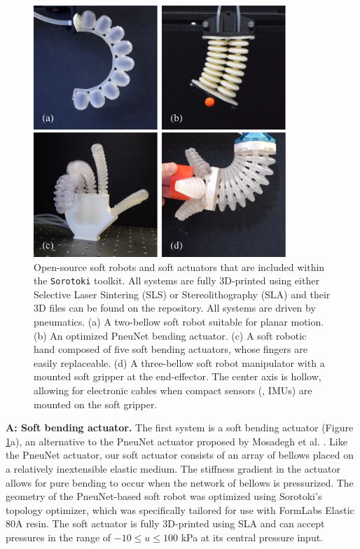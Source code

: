 \begin{figure}[!t]
    \centering
    \includegraphics*[width=0.85\textwidth]{./pdf/thesis-figure-6-1.pdf}
    \caption{\small Open-source soft robots and soft actuators that are included within the \texttt{Sorotoki} toolkit. All systems are fully 3D-printed using either Selective Laser Sintering (SLS) or Stereolithography (SLA) and their 3D files can be found on the repository. All systems are driven by pneumatics. (a) A two-bellow soft robot suitable for planar motion. (b) An optimized PneuNet bending actuator. (c) A soft robotic hand composed of five soft bending actuators, whose fingers are easily replaceable. (d) A three-bellow soft robot manipulator with a mounted soft gripper at the end-effector. The center axis is hollow, allowing for electronic cables when compact sensors (\eg, IMUs) are mounted on the soft gripper.}
    \vspace{-3mm}
    \label{fig:C5:examplebots}
\end{figure}
%  
\textbf{A: Soft bending actuator.} The first system is a soft bending actuator (Figure \ref{fig:C5:examplebots}a), an alternative to the PneuNet actuator proposed by Mosadegh et al. \cite{Mosadegh2014}. Like the PneuNet actuator, our soft actuator consists of an array of bellows placed on a relatively inextensible elastic medium. The stiffness gradient in the actuator allows for pure bending to occur when the network of bellows is pressurized. The geometry of the PneuNet-based soft robot was optimized using Sorotoki's topology optimizer, which was specifically tailored for use with FormLabs Elastic 80A resin. The soft actuator is fully 3D-printed using SLA and can accept pressures in the range of $-10 \le u \le 100$ kPa at its central pressure input. \\


